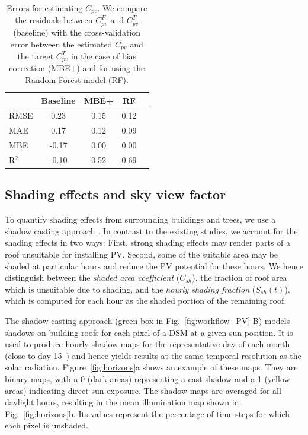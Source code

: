 \begin{table}[tb]
\centering
\footnotesize
\caption{Errors for estimating $C_{\mathit{pv}}$. We compare the residuals between $C_{\mathit{pv}}^F$ and $C_{\mathit{pv}}^T$ (baseline) with the cross-validation error between the estimated $C_{\mathit{pv}}$ and the target $C_{\mathit{pv}}^T$ in the case of bias correction (MBE+) and for using the Random Forest model (RF).}
\label{tab:errors_Cpv}
\begin{tabular}{lcccc}
\hline
      & \textbf{Baseline} & \textbf{MBE+}  & \textbf{RF}   \\ \hline
RMSE  & 0.23     & 0.15  & 0.12 \\
MAE   & 0.17     & 0.12  & 0.09 \\
MBE   & -0.17    & 0.00  & 0.00 \\
R$^2$ & -0.10    & 0.52  & 0.69 \\ \hline
\end{tabular}
\end{table}


\subsection{Shading effects and sky view factor}
\label{shade}
\label{svf}

To quantify shading effects from surrounding buildings and trees, we use a shadow casting approach \cite{buffat_scalable_2018, desthieux_solar_2018, klauser_solarpotentialanalyse_2016, ramirez_camargo_spatio-temporal_2015}. 
In contrast to the existing studies, we account for the shading effects in two ways:
First, strong shading effects may render parts of a roof unsuitable for installing PV. 
Second, some of the suitable area may be shaded at particular hours and reduce the PV potential for these hours. We hence distinguish between the \textit{shaded area coefficient} ($C_{sh}$), the fraction of roof area which is unsuitable due to shading, and the \textit{hourly shading fraction} ($S_{sh}(t)$), which is computed for each hour as the shaded portion of the remaining roof. 

The shadow casting approach (green box in Fig.~\ref{fig:workflow_PV}-B) models shadows on building roofs for each pixel of a DSM at a given sun position. It is used to produce hourly shadow maps for the representative day of each month (close to day 15~\cite{desthieux_solar_2018}) and hence yields results at the same temporal resolution as the solar radiation.
Figure~\ref{fig:horizons}a shows an example of these maps. They are binary maps, with a 0 (dark areas) representing a cast shadow and a 1 (yellow areas) indicating direct sun exposure. The shadow maps are averaged for all daylight hours, resulting in the mean illumination map shown in Fig.~\ref{fig:horizons}b. Its values represent the percentage of time steps for which each pixel is unshaded.

